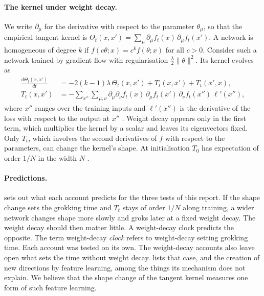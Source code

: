 \documentclass[a4paper,11pt]{article} %
\begin{document}
\paragraph{The kernel under weight decay.}
We write $\partial_\mu$ for the derivative with respect to the parameter
$\theta_\mu$, so that the empirical tangent kernel is
$\Theta_t(x,x') = \sum_\mu \partial_\mu f_t(x)\,\partial_\mu f_t(x')$.
A network is homogeneous of degree $k$ if $f(c\theta;x) = c^k f(\theta;x)$
for all $c > 0$. Consider such a network trained by gradient flow with regularisation
$\tfrac{\lambda}{2}\lVert\theta\rVert^2$. Its kernel evolves as
\begin{align}
  \frac{d\Theta_t(x,x')}{dt} &= -2(k-1)\lambda\,\Theta_t(x,x')
  + T_t(x,x') + T_t(x',x),
  \label{eq:kernelflow}\\
  T_t(x,x') &= -\sum_{x''}\sum_{\mu,\nu}\partial_\mu\partial_\nu f_t(x)\,
  \partial_\mu f_t(x')\,\partial_\nu f_t(x'')\,\ell'(x''),\nonumber
\end{align}
where $x''$ ranges over the training inputs and $\ell'(x'')$ is the derivative
of the loss with respect to the output at $x''$
\citep[Eqs.~S5 and S6, arXiv v2]{lewkowyczTrainingDynamicsDeep2021}.
Weight decay appears only in the first term, which multiplies the kernel by a
scalar and leaves its eigenvectors fixed. Only $T_t$, which involves the second
derivatives of $f$ with respect to the parameters, can change the kernel's
shape. At initialisation $T_0$ has expectation of order $1/N$ in the width $N$
\citep{lewkowyczTrainingDynamicsDeep2021}.

\paragraph{Predictions.}
 sets out what each account predicts for the three tests
of this report. If the shape change sets the grokking
time and $T_t$ stays of order $1/N$ along
training, a wider network changes shape more slowly and groks later
at a fixed weight
decay.
The weight decay should then matter little. A weight-decay
clock predicts %
the opposite. The term weight-decay \textit{clock} refers to weight-decay setting grokking time.
Each account was tested on its own. The weight-decay accounts also leave
open what sets the time without weight decay.  lists that case, and the creation of new
directions by feature learning, among the things its mechanism does not
explain. We believe that the shape change of the tangent kernel
measures one form of such feature
learning.
\end{document}
